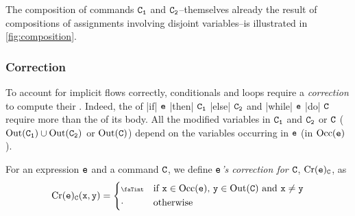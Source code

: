 The composition of commands $\mathtt{C_1}$ and $\mathtt{C_2}$--themselves already the result of compositions of assignments involving disjoint variables--is illustrated in \autoref{fig:composition}.

\subsubsection{Correction}

To account for implicit flows correctly, conditionals and loops require a \emph{correction} to compute their \SFMs.
Indeed, the \SFMs of \prc|if| \(\mathtt{e}\) \prc|then| \(\mathtt{C_{1}}\) \prc|else| \(\mathtt{C_{2}}\) and \prc|while| $\mathtt{e}$ \prc|do| $\mathtt{C}$ require more than the \SFM of its body.
All the modified variables in \(\mathtt{C_1}\) and \(\mathtt{C_2}\) or \(\mathtt{C}\) (\eg \(\operatorname{Out}(\mathtt{C_1}) \cup \operatorname{Out}(\mathtt{C_2})\) or \(\operatorname{Out}(\mathtt{C})\)) depend on the variables occurring in \(\mathtt{e}\) (\eg  in \(\operatorname{Occ}(\mathtt{e})\)).

\begin{definition}[Correction]
    For an expression $\mathtt{e}$ and a command \(\mathtt{C}\), we define \emph{$\mathtt{e}$'s correction for $\mathtt{C}$}, $\mathrm{Cr}(\mathtt{e})_{\mathtt{C}}$, as
    \[
        \corr{\comm{e}}_{\comm{C}}(\textnormal{\prc|x|},\textnormal{\prc|y|})=
        \begin{dcases*}
            \vi &  if $\textnormal{\prc|x|} \in \Occ(\comm{e})$, $\textnormal{\prc|y|} \in \Out(\comm{C})$ and \(\comm{x} \neq \comm{y}\)\\
            \nv & otherwise
        \end{dcases*}
    \]
\end{definition}
%

